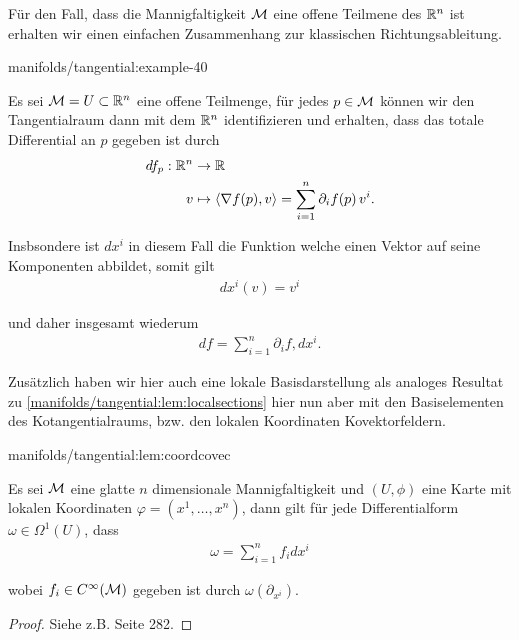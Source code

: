 \par
Für den Fall, dass die Mannigfaltigkeit \(\mathcal{M}\) eine offene Teilmene des \(\mathbb{R}^n\) ist erhalten wir einen einfachen Zusammenhang zur klassischen Richtungsableitung.
\begin{example}{}{manifolds/tangential:example-40}



\par
Es sei \(\mathcal{M}=U\subset\mathbb{R}^n\) eine offene Teilmenge, für jedes \(p\in\mathcal{M}\) können wir den Tangentialraum dann mit dem \(\mathbb{R}^n\) identifizieren und erhalten, dass das totale Differential an \(p\) gegeben ist durch
\begin{align*}
df_p:\mathbb{R}^n&\to\mathbb{R}\\
v&\mapsto \langle \nabla f(p), v \rangle = \sum_{i=1}^n \partial_i f(p)\, v^i.
\end{align*}
\par
Insbsondere ist \(dx^{i}\) in diesem Fall die Funktion welche einen Vektor auf seine Komponenten abbildet, somit gilt
\begin{align*}
dx^{i}(v) = v^i
\end{align*}
\par
und daher insgesamt wiederum
\begin{align*}
df = \sum_{i=1}^n \partial_i f, dx^{i}.
\end{align*}\end{example}

\par
Zusätzlich haben wir hier auch eine lokale Basisdarstellung als analoges Resultat zu \cref{manifolds/tangential:lem:localsections} hier nun aber mit den Basiselementen des Kotangentialraums, bzw. den lokalen Koordinaten Kovektorfeldern.
\begin{lemma}{}{manifolds/tangential:lem:coordcovec}



\par
Es sei \(\mathcal{M}\) eine glatte \(n\) dimensionale Mannigfaltigkeit und \((U,\phi)\) eine Karte mit lokalen Koordinaten \(\varphi=(x^1,\ldots, x^n)\),  dann gilt für jede Differentialform \(\omega\in\Omega^1(U)\), dass
\begin{align*}
\omega = \sum_{i=1}^n f_i dx^i
\end{align*}
\par
wobei \(f_i\in C^\infty(\mathcal{M})\) gegeben ist durch \(\omega(\partial_{x^i})\).
\end{lemma}

\begin{proof}
 Siehe z.B. \cite{Lee03} Seite 282.
\end{proof}


